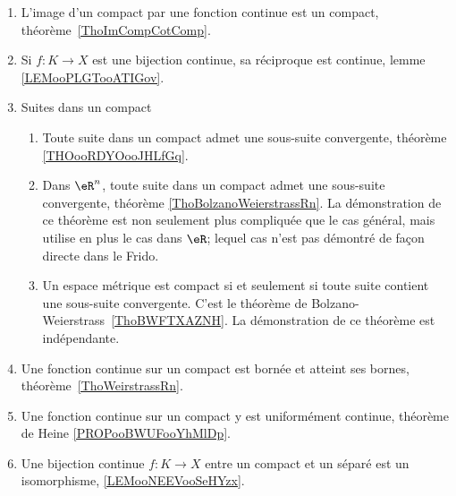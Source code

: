 \begin{description}
\begin{enumerate}
			\item
			      L'image d'un compact par une fonction continue est un compact, théorème~\ref{ThoImCompCotComp}.
			\item
			      Si \( f\colon K\to X\) est une bijection continue, sa réciproque est continue, lemme \ref{LEMooPLGTooATIGov}.
			\item
			      Suites dans un compact
			      \begin{enumerate}
				      \item
				            Toute suite dans un compact admet une sous-suite convergente, théorème \ref{THOooRDYOooJHLfGq}.
				      \item
				            Dans \( \eR^n\), toute suite dans un compact admet une sous-suite convergente, théorème \ref{ThoBolzanoWeierstrassRn}. La démonstration de ce théorème est non seulement plus compliquée que le cas général, mais utilise en plus le cas dans \( \eR\); lequel cas n'est pas démontré de façon directe dans le Frido.
				      \item
				            Un espace métrique est compact si et seulement si toute suite contient une sous-suite convergente. C'est le théorème de Bolzano-Weierstrass~\ref{ThoBWFTXAZNH}. La démonstration de ce théorème est indépendante.
			      \end{enumerate}
			\item
			      Une fonction continue sur un compact est bornée et atteint ses bornes, théorème~\ref{ThoWeirstrassRn}.
			\item
			      Une fonction continue sur un compact y est uniformément continue, théorème de Heine \ref{PROPooBWUFooYhMlDp}.
			\item
			      Une bijection continue \( f\colon K\to X\) entre un compact et un séparé est un isomorphisme, \ref{LEMooNEEVooSeHYzx}.
		\end{enumerate}


\end{description}

